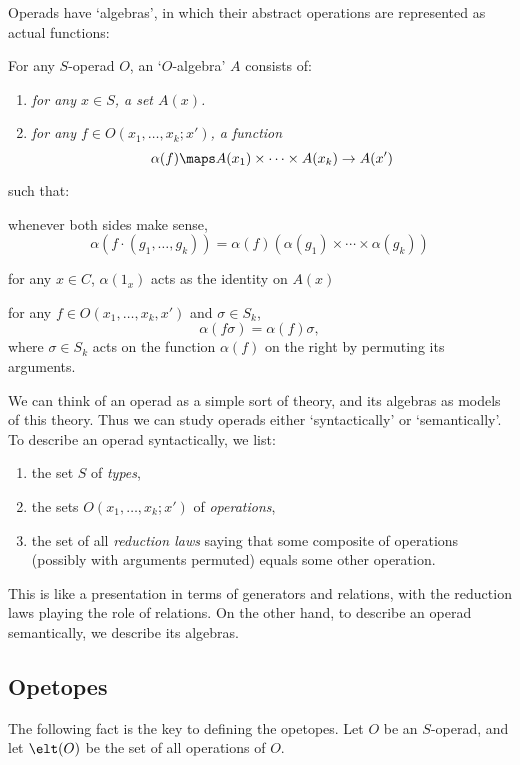 Operads have `algebras', in which their abstract operations are 
represented as actual functions:

\begin{defn}  \label{c.op.algebras}\et  For any $S$-operad
$O$, an `$O$-algebra' $A$ consists of:
{\rm \begin{enumerate}
\item {\it for any $x \in S$, a set $A(x)$.}
\item {\it for any $f \in O(x_1,\dots,x_k;x')$, a function
\[   \alpha(f) \maps A(x_1) \times \cdots \times A(x_k) \to A(x') \]  }
\end{enumerate}}
\noindent such that:
\begin{alphalist}
\item whenever both sides make sense,
\[      \alpha(f \cdot (g_1, \dots, g_k)) = \alpha(f) (\alpha(g_1)
\times \cdots \times \alpha(g_k)) \]
\item  for any $x \in C$, $\alpha(1_x)$ acts as the
identity on $A(x)$
\item for any $f \in O(x_1,\dots,x_k,x')$ and $\sigma \in S_k$,
\[         \alpha(f\sigma) = \alpha(f)\sigma, \]
where $\sigma \in S_k$ acts on the function $\alpha(f)$ 
on the right by permuting its arguments. 
\end{alphalist}
\end{defn}

We can think of an operad as a simple sort of theory, and its
algebras as models of this theory.   Thus we can study operads
either `syntactically' or `semantically'.  To describe an operad
syntactically, we list:
\begin{enumerate}
\item the set $S$ of {\it types},
\item the sets $O(x_1,\dots,x_k;x')$ of {\it operations},
\item the set of all {\it reduction laws} saying that some composite of
operations (possibly with arguments permuted) equals some other
operation.  
\end{enumerate}
This is like a presentation in terms of generators and relations, with
the reduction laws playing the role of relations.  On the other hand, to
describe an operad semantically, we describe its algebras.  

\subsection{Opetopes}

The following fact is the key to defining the opetopes.  Let $O$ be an
$S$-operad, and let $\elt(O)$ be the set of all operations of $O$.

